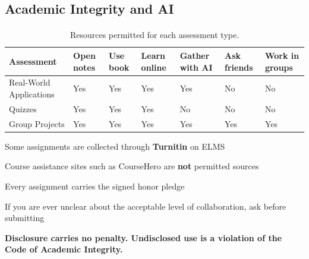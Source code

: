 \documentclass[
    10pt,
    dvipsnames,
    svgnames,
    x11names,
    aspectratio=1610,
    english,
    codeminted]{beamer}
\begin{document}
\subsection*{Academic Integrity and AI}
\begingroup
\divframetrue
\renewcommand{\divbartextA}{\secname}
\renewcommand{\divbartextB}{}
\begin{frame}{\secname}
  \divbar{\secname}{\subsecname}
  
  \framesubtitle{\subsecname}

\begin{table}[h]
\caption{Resources permitted for each assessment type.}
\scriptsize\centering
\renewcommand{\arraystretch}{1.2}
\begin{tabular}{m{2.8cm}m{1.2cm}m{1.1cm}m{1.2cm}m{1.2cm}m{1.2cm}m{1.2cm}}
  \toprule
  \textbf{Assessment} & \textbf{Open notes} & \textbf{Use book} & \textbf{Learn online} & \textbf{Gather with AI} & \textbf{Ask friends} & \textbf{Work in groups} \\
  \midrule
  Real-World Applications & Yes & Yes & Yes & Yes & No  & No  \\
  Quizzes                 & Yes & Yes & Yes & No  & No  & No  \\
  Group Projects          & Yes & Yes & Yes & Yes & Yes & Yes \\
  \bottomrule
\end{tabular}
\end{table}

\begin{compactitem}
\small
    \item Some assignments are collected through \textbf{Turnitin} on ELMS
    \item Course assistance sites such as CourseHero are \textbf{not} permitted sources
    \item Every assignment carries the signed honor pledge
    \item If you are ever unclear about the acceptable level of collaboration, ask before submitting
\end{compactitem}
\medskip
\begin{MyBox}
\textbf{Disclosure carries no penalty. Undisclosed use is a violation of the Code of Academic Integrity.}
\end{MyBox}
\end{frame}
\endgroup
\end{document}
